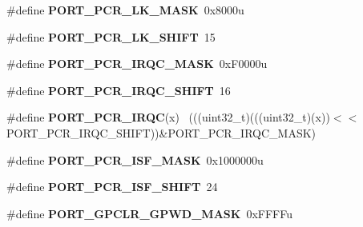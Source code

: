 \begin{DoxyCompactItemize}
\item 
\hypertarget{group___p_o_r_t___register___masks_ga671e65e4960f3b103af68881ae99d85a}{}\#define {\bfseries P\+O\+R\+T\+\_\+\+P\+C\+R\+\_\+\+L\+K\+\_\+\+M\+A\+S\+K}~0x8000u\label{group___p_o_r_t___register___masks_ga671e65e4960f3b103af68881ae99d85a}

\item 
\hypertarget{group___p_o_r_t___register___masks_ga72ad78bf008f1968310a8abcd09b29ea}{}\#define {\bfseries P\+O\+R\+T\+\_\+\+P\+C\+R\+\_\+\+L\+K\+\_\+\+S\+H\+I\+F\+T}~15\label{group___p_o_r_t___register___masks_ga72ad78bf008f1968310a8abcd09b29ea}

\item 
\hypertarget{group___p_o_r_t___register___masks_gabaef70d886fda0a7da8e862308bf5909}{}\#define {\bfseries P\+O\+R\+T\+\_\+\+P\+C\+R\+\_\+\+I\+R\+Q\+C\+\_\+\+M\+A\+S\+K}~0x\+F0000u\label{group___p_o_r_t___register___masks_gabaef70d886fda0a7da8e862308bf5909}

\item 
\hypertarget{group___p_o_r_t___register___masks_ga0bda43cd85ca4d5df17f12a193937d81}{}\#define {\bfseries P\+O\+R\+T\+\_\+\+P\+C\+R\+\_\+\+I\+R\+Q\+C\+\_\+\+S\+H\+I\+F\+T}~16\label{group___p_o_r_t___register___masks_ga0bda43cd85ca4d5df17f12a193937d81}

\item 
\hypertarget{group___p_o_r_t___register___masks_gadbd5b173d13c0766ed34cb90095ba789}{}\#define {\bfseries P\+O\+R\+T\+\_\+\+P\+C\+R\+\_\+\+I\+R\+Q\+C}(x)                                              ~(((uint32\+\_\+t)(((uint32\+\_\+t)(x))$<$$<$P\+O\+R\+T\+\_\+\+P\+C\+R\+\_\+\+I\+R\+Q\+C\+\_\+\+S\+H\+I\+F\+T))\&P\+O\+R\+T\+\_\+\+P\+C\+R\+\_\+\+I\+R\+Q\+C\+\_\+\+M\+A\+S\+K)\label{group___p_o_r_t___register___masks_gadbd5b173d13c0766ed34cb90095ba789}

\item 
\hypertarget{group___p_o_r_t___register___masks_ga154d9308c2ab5b6a78ab04d9f3b08879}{}\#define {\bfseries P\+O\+R\+T\+\_\+\+P\+C\+R\+\_\+\+I\+S\+F\+\_\+\+M\+A\+S\+K}~0x1000000u\label{group___p_o_r_t___register___masks_ga154d9308c2ab5b6a78ab04d9f3b08879}

\item 
\hypertarget{group___p_o_r_t___register___masks_ga5fbf95753704fb1d71da88299c11105e}{}\#define {\bfseries P\+O\+R\+T\+\_\+\+P\+C\+R\+\_\+\+I\+S\+F\+\_\+\+S\+H\+I\+F\+T}~24\label{group___p_o_r_t___register___masks_ga5fbf95753704fb1d71da88299c11105e}

\item 
\hypertarget{group___p_o_r_t___register___masks_gaa7e4a890e9d09d85279889ce3ecb0044}{}\#define {\bfseries P\+O\+R\+T\+\_\+\+G\+P\+C\+L\+R\+\_\+\+G\+P\+W\+D\+\_\+\+M\+A\+S\+K}~0x\+F\+F\+F\+Fu\label{group___p_o_r_t___register___masks_gaa7e4a890e9d09d85279889ce3ecb0044}


\end{DoxyCompactItemize}
